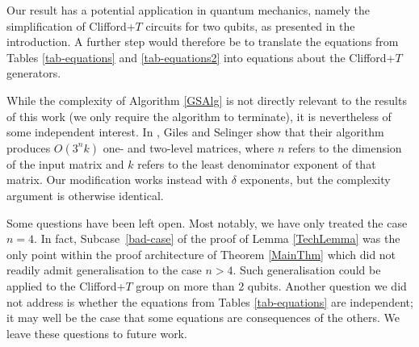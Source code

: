 \documentclass{dalthesis}
\theoremstyle{theorem}
\theoremstyle{definition}
\theoremstyle{definition}  %
\theoremstyle{definition}
\renewcommand{\:}{\mathbin{:}}
\begin{document}
Our result has a potential application in quantum mechanics, namely the simplification of Clifford+$T$ circuits for two qubits, as presented in the introduction. A further step would therefore be to translate the equations from Tables \ref{tab-equations} and \ref{tab-equations2} into equations about the Clifford+$T$ generators. 

While the complexity of Algorithm \ref{GSAlg} is not directly relevant to the results of this work (we only require the algorithm to terminate), it is nevertheless of some independent interest. In \cite{GILES-SEL}, Giles and Selinger show that their algorithm produces $O(3^nk)$ one- and two-level matrices, where $n$ refers to the dimension of the input matrix and $k$ refers to the least denominator exponent of that matrix. Our modification works instead with $\delta$ exponents, but the complexity argument is otherwise identical.

Some questions have been left open. Most notably, we have only treated the case $n=4.$ In fact, Subcase~\ref{bad-case} of the proof of Lemma \ref{TechLemma} was the only point within the proof architecture of Theorem \ref{MainThm} which did not readily admit generalisation to the case $n>4.$ Such generalisation could be applied to the Clifford+$T$ group on more than 2 qubits. Another question we did not address is whether the equations from Tables \ref{tab-equations} are independent; it may well be the case that some equations are consequences of the others. We leave these questions to future work.

\appendix

  
\end{document}
